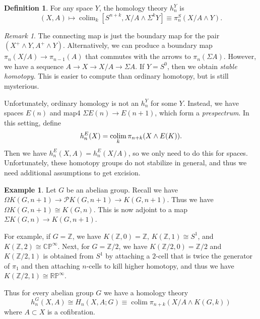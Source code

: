 \documentclass[leqno, openany]{memoir}
\theoremstyle{definition}
\newtheorem{defn}[thm]{Definition}
\newtheorem{exm}[thm]{Example}
\theoremstyle{remark}
\newtheorem{rmk}[thm]{Remark}
\theoremstyle{plain}
\theoremstyle{definition}
\theoremstyle{remark}
\newcommand{\R}{\mathbb{R}}
\newcommand{\C}{\mathbb{C}}
\newcommand{\Z}{\mathbb{Z}}
\renewcommand{\P}{\mathbb{P}}
\newcommand{\mc}[1]{\mathcal{#1}}
\begin{document}
\begin{defn}
    For any space $Y$, the homology theory $h_n^Y$ is 
    \[ (X,A) \mapsto \operatorname{colim}_k [S^{n+k}, X/A \wedge \Sigma^k Y] \equiv \pi_n^S(X/A \wedge Y). \]
\end{defn}


\begin{rmk}
    The connecting map is just the boundary map for the pair $(X^+ \wedge Y, A^+ \wedge Y)$. Alternatively, we can produce a boundary map $\pi_n(X/A) \to \pi_{n-1}(A)$ that commutes with the arrows to $\pi_n(\Sigma A)$. However, we have a sequence $A \to X \to X/A \to \Sigma A$. If $Y = S^0$, then we obtain \textit{stable homotopy}. This is easier to compute than ordinary homotopy, but is still mysterious. 
\end{rmk}

Unfortunately, ordinary homology is not an $h_n^Y$ for some $Y$. Instead, we have spaces $E(n)$ and map4 $\Sigma E(n) \to E(n+1)$, which form a \textit{prespectrum}. In this setting, define
\[ h_n^E(X) = \operatornamewithlimits{colim}_k \pi_{n+k}(X \wedge E(K)). \]
Then we have $h_n^E(X,A) = h_n^E(X/A)$, so we only need to do this for spaces. Unfortunately, these homotopy groups do not stabilize in general, and thus we need additional assumptions to get excision.

\begin{exm}
    Let $G$ be an abelian group. Recall we have $\Omega K(G, n+1) \to \mc{P} K(G, n+1) \to K(G, n+1)$. Thus we have $\Omega K(G, n+1) \cong K(G, n)$. This is now adjoint to a map $\Sigma K(G, n) \to K(G, n+1)$. 

    For example, if $G = \Z$, we have $K(\Z, 0) = \Z$, $K(\Z, 1) \cong S^1$, and $K(\Z, 2) \cong \C\P^{\infty}$. Next, for $G = \Z/2$, we have $K(\Z/2, 0) = \Z/2$ and $K(\Z/2, 1)$ is obtained from $S^1$ by attaching a $2$-cell that is twice the generator of $\pi_1$ and then attaching $n$-cells to kill higher homotopy, and thus we have $K(\Z/2, 1) \cong \R\P^{\infty}$. 

    Thus for every abelian group $G$ we have a homology theory 
    \[ h_n^G(X, A) \cong H_n(X,A;G) \equiv \operatorname{colim} \pi_{n+k}(X/A \wedge K(G, k)) \]
    where $A \subset X$ is a cofibration.
\end{exm}
\end{document}
